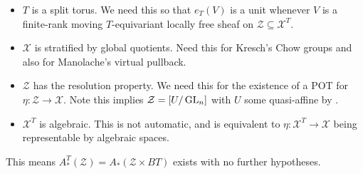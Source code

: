 \noindent
\begin{itemize}
  \item \(T\) is a split torus. We need this so that \(e_T(V)\) is a unit whenever \(V\) is a finite-rank moving \(T\)-equivariant locally free sheaf on \(\mathcal Z\subseteq \mathcal X^T\).
  \item \(\mathcal X\) is stratified by global quotients. Need this for Kresch's Chow groups and also for Manolache's virtual pullback.
  \item \(\mathcal Z\) has the resolution property. We need this for the existence of a POT for \(\eta:\mathcal Z\to \mathcal X\). Note this implies \(\mathcal Z = [U/\operatorname{GL}_n]\) with \(U\) some quasi-affine by \cite{totaro_ResolutionPropertySchemes2004}.
  \item \(\mathcal X^T\) is algebraic. This is not automatic, and is equivalent to \(\eta:\mathcal X^T\to \mathcal X\) being representable by algebraic spaces.
\end{itemize}

This means \(A^T_*(\mathcal Z) = A_*(\mathcal Z\times BT)\) exists with no further hypotheses.
